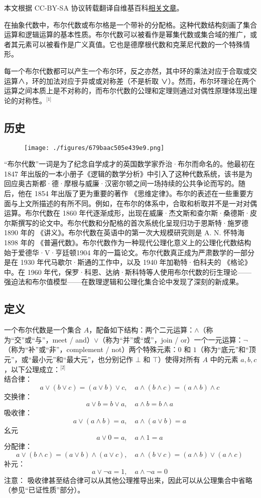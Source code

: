 
本文根据 CC-BY-SA 协议转载翻译自维基百科\href{https://en.wikipedia.org/wiki/Boolean_algebra_(structure)}{相关文章}。

在抽象代数中，布尔代数或布尔格是一个带补的分配格。这种代数结构刻画了集合运算和逻辑运算的基本性质。布尔代数可以被看作是幂集代数或集合域的推广，或者其元素可以被看作是广义真值。它也是德摩根代数和克莱尼代数的一个特殊情形。

每一个布尔代数都可以产生一个布尔环，反之亦然，其中环的乘法对应于合取或交运算∧，环的加法对应于异或或对称差（不是析取 ∨）。然而，布尔环理论在两个运算之间本质上是不对称的，而布尔代数的公理和定理则通过对偶性原理体现出理论的对称性。\(^\text{[1]}\)
\subsection{历史}
\begin{figure}[ht]
\centering
\texttt{[image: ./figures/679baac505e439e9.png]}
\caption{} \label{fig_BRds_1}
\end{figure}
“布尔代数”一词是为了纪念自学成才的英国数学家乔治·布尔而命名的。他最初在 1847 年出版的一本小册子《逻辑的数学分析》中引入了这种代数系统，该书是为回应奥古斯都·德·摩根与威廉·汉密尔顿之间一场持续的公共争论而写的。随后，他在 1854 年出版了更为重要的著作 《思维定律》。布尔的表述在一些重要方面与上文所描述的有所不同。例如，在布尔的体系中，合取和析取并不是一对对偶运算。布尔代数在 1860 年代逐渐成形，出现在威廉·杰文斯和查尔斯·桑德斯·皮尔斯撰写的论文中。布尔代数和分配格的首次系统化呈现归功于恩斯特·施罗德1890 年的 《讲义》。布尔代数在英语中的第一次大规模研究则是 A. N. 怀特海1898 年的 《普遍代数》。布尔代数作为一种现代公理化意义上的公理化代数结构始于爱德华·V·亨廷顿1904 年的一篇论文。布尔代数真正成为严肃数学的一部分是在 1930 年代马歇尔·斯通的工作中，以及 1940 年加勒特·伯科夫的 《格论》 中。在 1960 年代，保罗·科恩、达纳·斯科特等人使用布尔代数的衍生理论——强迫法和布尔值模型——在数理逻辑和公理化集合论中发现了深刻的新成果。
\subsection{定义}
一个布尔代数是一个集合 $A$，配备如下结构：两个二元运算：$\land$（称为“交”或“与”，meet / and）$\lor$（称为“并”或“或”，join / or）一个一元运算：$\lnot$（称为“补”或“非”，complement / not）两个特殊元素：$0$ 和 $1$（称为“底元”和“顶元”，或“最小元”和“最大元”，也分别记作 $\bot$ 和 $\top$）使得对所有 $A$ 中的元素 $a, b, c$，以下公理成立：\(^\text{[2]}\)\\
结合律：
   $$
   a \lor (b \lor c) = (a \lor b) \lor c, \quad  
   a \land (b \land c) = (a \land b) \land c~
   $$
交换律：
   $$
   a \lor b = b \lor a, \quad  
   a \land b = b \land a~
   $$
吸收律：
   $$
   a \lor (a \land b) = a, \quad  
   a \land (a \lor b) = a~
   $$
幺元
   $$
   a \lor 0 = a, \quad  
   a \land 1 = a~
   $$
分配律：
   $$
   a \lor (b \land c) = (a \lor b) \land (a \lor c), \quad  
   a \land (b \lor c) = (a \land b) \lor (a \land c)~
   $$
补元：
   $$
   a \lor \lnot a = 1, \quad  
   a \land \lnot a = 0~
   $$
注意： 吸收律甚至结合律可以从其他公理推导出来，因此可以从公理集合中省略（参见“已证性质”部分）。

